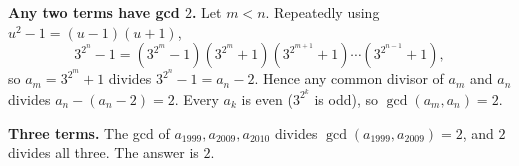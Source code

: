 \textbf{Any two terms have gcd $2$.} Let $m<n$. Repeatedly using $u^2-1=(u-1)(u+1)$,
\[
3^{2^n}-1=\left(3^{2^m}-1\right)\left(3^{2^m}+1\right)\left(3^{2^{m+1}}+1\right)\cdots\left(3^{2^{n-1}}+1\right),
\]
so $a_m=3^{2^m}+1$ divides $3^{2^n}-1=a_n-2$. Hence any common divisor of $a_m$ and $a_n$ divides $a_n-(a_n-2)=2$. Every $a_k$ is even ($3^{2^k}$ is odd), so $\gcd(a_m,a_n)=2$.

\textbf{Three terms.} The gcd of $a_{1999},a_{2009},a_{2010}$ divides $\gcd(a_{1999},a_{2009})=2$, and $2$ divides all three. The answer is $\boxed{2}$.
